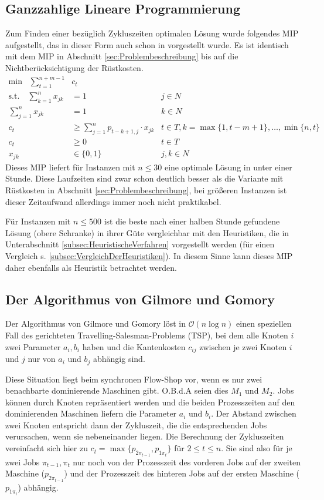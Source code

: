 \documentclass{scrreprt}
\begin{document}
\subsection{Ganzzahlige Lineare Programmierung}
\label{subsec:LineareProgrammierung}
Zum Finden einer bezüglich Zykluszeiten optimalen Lösung wurde folgendes MIP aufgestellt, das in dieser Form auch schon in \cite{karabati} vorgestellt wurde.
Es ist identisch mit dem MIP in Abschnitt \ref{sec:Problembeschreibung} bis auf die Nichtberücksichtigung der Rüstkosten.
\begin{align}
    \text{min} \quad \sum_{t=1}^{n+m-1} &c_t \\
    \text{s.t.}\quad \sum_{k=1}^n x_{jk} &= 1 & j\in N \\
                     \sum_{j=1}^n x_{jk} &= 1 & k\in N \\
    c_t &\geq \sum_{j=1}^n p_{t-k+1,j} \cdot x_{jk} & t\in T, k=\max\{1,t-m+1\},\ldots,\min\{n,t\} \\
    c_t &\geq 0 & t\in T \\
    x_{jk} &\in \{0,1\} & j,k\in N
\end{align}
Dieses MIP liefert für Instanzen mit $n\leq 30$ eine optimale Lösung in unter einer Stunde.
Diese Laufzeiten sind zwar schon deutlich besser als die Variante mit Rüstkosten in Abschnitt \ref{sec:Problembeschreibung},
bei größeren Instanzen ist dieser Zeitaufwand allerdings immer noch nicht praktikabel. 

Für Instanzen mit $n\leq 500$ ist die beste nach einer halben Stunde gefundene Lösung (obere Schranke) in ihrer Güte vergleichbar mit den Heuristiken,
die in Unterabschnitt \ref{subsec:HeuristischeVerfahren} vorgestellt werden (für einen Vergleich s. \ref{subsec:VergleichDerHeuristiken}).
In diesem Sinne kann dieses MIP daher ebenfalls als Heuristik betrachtet werden.


\subsection{Der Algorithmus von Gilmore und Gomory}
\label{subsec:DerAlgorithmusVonGilmoreUndGomory}
Der Algorithmus von Gilmore und Gomory \cite{gg} löst in $\mathcal{O}(n\log n)$ einen speziellen Fall des gerichteten Travelling-Salesman-Problems (TSP),
bei dem alle Knoten $i$ zwei Parameter $a_i,b_i$ haben und die Kantenkosten $c_{ij}$ zwischen je zwei Knoten $i$ und $j$ nur von $a_i$ und $b_j$ abhängig sind.

Diese Situation liegt beim synchronen Flow-Shop vor, wenn es nur zwei benachbarte dominierende Maschinen gibt.
O.B.d.A seien dies $M_1$ und $M_2$.
Jobs können durch Knoten repräsentiert werden und die beiden Prozesszeiten auf den dominierenden Maschinen liefern die Parameter $a_i$ und $b_i$. 
Der Abstand zwischen zwei Knoten entspricht dann der Zykluszeit, die die entsprechenden Jobs verursachen, wenn sie nebeneinander liegen.
Die Berechnung der Zykluszeiten vereinfacht sich hier zu
$c_t = \max \{p_{2\pi_{t-1}},p_{1\pi_t}\}$ für $2\leq t\leq n$.
Sie sind also für je zwei Jobs $\pi_{t-1},\pi_{t}$ nur noch von der Prozesszeit des vorderen Jobs auf der zweiten Maschine ($p_{2\pi_{t-1}}$) 
und der Prozesszeit des hinteren Jobs auf der ersten Maschine ($p_{1\pi_t}$) abhängig.
\end{document}

